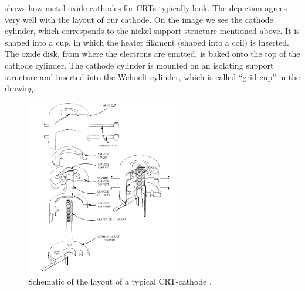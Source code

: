  shows how metal oxide cathodes for CRTs typically look. The depiction agrees very well with the layout of our cathode. On the image we see the cathode cylinder, which corresponds to the nickel support structure mentioned above. It is shaped into a cup, in which the heater filament (shaped into a coil) is inserted. The oxide disk, from where the electrons are emitted, is baked onto the top of the cathode cylinder. The cathode cylinder is mounted on an isolating support structure and inserted into the Wehnelt cylinder, which is called ``grid cup'' in the drawing. 
  

\begin{figure}
	\centering
	\includegraphics[width=0.6\textwidth]{Chapters/CRT-Basics/Cathode_layout}
	\caption{Schematic of the layout of a typical CRT-cathode \cite{deVere69}.}
	\label{fig:cathodelayout}
\end{figure}














